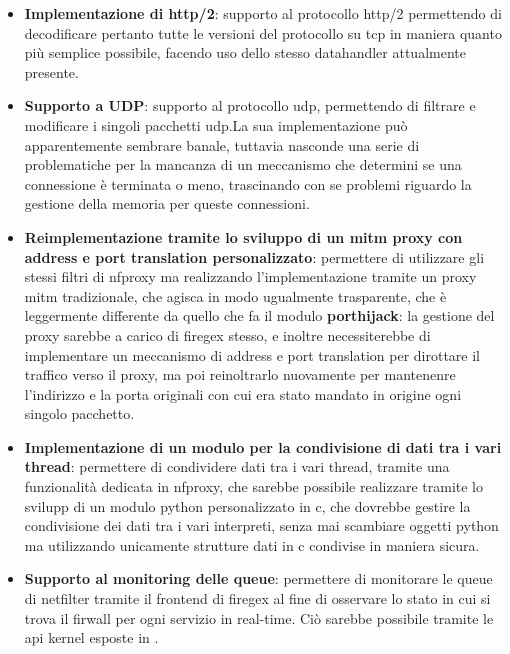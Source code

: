 \begin{itemize}
    \setlength{\itemsep}{2pt}
    \setlength{\parskip}{2pt}
    \item \textbf{Implementazione di \gls{http}/2}: supporto al protocollo \gls{http}/2 permettendo di decodificare pertanto tutte le versioni del protocollo su \gls{tcp} in maniera quanto più semplice possibile, facendo uso dello stesso datahandler attualmente presente.
    
    \item \textbf{Supporto a UDP}: supporto al protocollo \gls{udp}, permettendo di filtrare e modificare i singoli pacchetti \gls{udp}.\@ La sua implementazione può apparentemente sembrare banale, tuttavia nasconde una serie di problematiche per la mancanza di un meccanismo che determini se una connessione è terminata o meno, trascinando con se problemi riguardo la gestione della memoria per queste connessioni.
    
    \item \textbf{Reimplementazione tramite lo sviluppo di un \gls{mitm} proxy con address e port translation personalizzato}: permettere di utilizzare gli stessi filtri di \gls{nfproxy} ma realizzando l'implementazione tramite un proxy \gls{mitm} tradizionale, che agisca in modo ugualmente trasparente, che è leggermente differente da quello che fa il modulo \textbf{\gls{porthijack}}: la gestione del proxy sarebbe a carico di firegex stesso, e inoltre necessiterebbe di implementare un meccanismo di address e port translation per dirottare il traffico verso il proxy, ma poi reinoltrarlo nuovamente per mantenenre l'indirizzo e la porta originali con cui era stato mandato in origine ogni singolo pacchetto.
    
    \item \textbf{Implementazione di un modulo per la condivisione di dati tra i vari thread}: permettere di condividere dati tra i vari thread, tramite una funzionalità dedicata in \gls{nfproxy}, che sarebbe possibile realizzare tramite lo svilupp di un modulo python personalizzato in c, che dovrebbe gestire la condivisione dei dati tra i vari interpreti, senza mai scambiare oggetti python ma utilizzando unicamente strutture dati in c condivise in maniera sicura.
    
    \item \textbf{Supporto al monitoring delle queue}: permettere di monitorare le queue di netfilter tramite il frontend di firegex al fine di osservare lo stato in cui si trova il firwall per ogni servizio in real-time. Ciò sarebbe possibile tramite le \gls{api} kernel esposte in .
\end{itemize}
